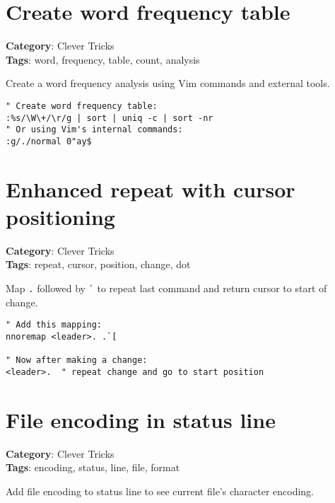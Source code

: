 {{\section{Create word frequency table}

\textbf{Category}: Clever Tricks\\ \textbf{Tags}: word, frequency, table, count, analysis
\vspace{0.5cm}

Create a word frequency analysis using Vim commands and external tools.

\begin{Exa*}{}
\begin{Verbatim}[fontsize=\footnotesize, breaklines, breakanywhere]
" Create word frequency table:
:%s/\W\+/\r/g | sort | uniq -c | sort -nr
" Or using Vim's internal commands:
:g/./normal 0"ay$
\end{Verbatim}
\end{Exa*}

\section{Enhanced repeat with cursor positioning}

\textbf{Category}: Clever Tricks\\ \textbf{Tags}: repeat, cursor, position, change, dot
\vspace{0.5cm}

Map {\footnotesize \Verb§.§} followed by {\footnotesize \Verb§`§} to repeat last command and return cursor to start of change.

\begin{Exa*}{}
\begin{Verbatim}[fontsize=\footnotesize, breaklines, breakanywhere]
" Add this mapping:
nnoremap <leader>. .`[

" Now after making a change:
<leader>.  " repeat change and go to start position
\end{Verbatim}
\end{Exa*}

\section{File encoding in status line}

\textbf{Category}: Clever Tricks\\ \textbf{Tags}: encoding, status, line, file, format
\vspace{0.5cm}

Add file encoding to status line to see current file's character encoding.

}}
